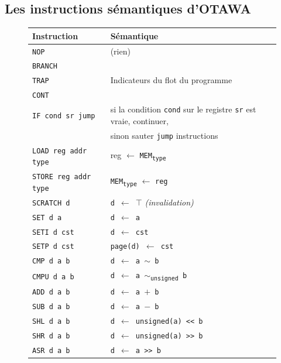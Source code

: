 \documentclass[french]{article}
\begin{document}
  \newpage{} %
  \subsection{Les instructions sémantiques d'OTAWA} 
 
  \begin{figure}
    \begin{tabular}{|l|l|} \hline
      \textbf{Instruction} & \textbf{Sémantique}\\ \hline \hline
      \texttt{NOP} & (rien)\\ \hline
      \texttt{BRANCH} & \\
      \texttt{TRAP} & Indicateurs du flot du programme\\
      \texttt{CONT} & \\ \hline
      \texttt{IF cond sr jump} & si la condition \texttt{cond} sur le registre \texttt{sr} est vraie, continuer,\\
      & sinon sauter \texttt{jump} instructions\\ \hline
      \texttt{LOAD reg addr type} & reg $\leftarrow$ \texttt{MEM\textsubscript{type}} \\ \hline
      \texttt{STORE reg addr type} & \texttt{MEM\textsubscript{type}} $\leftarrow$ \texttt{reg}\\ \hline
      \texttt{SCRATCH d} & \texttt{d $\leftarrow$ $\top$} \textit{(invalidation)}\\ \hline
      \texttt{SET d a} & \texttt{d $\leftarrow$ a}\\ \hline
      \texttt{SETI d cst} & \texttt{d $\leftarrow$ cst}\\ \hline
      \rowcolor{Gray} \texttt{SETP d cst} & \texttt{page(d) $\leftarrow$ cst}\\ \hline
      \texttt{CMP d a b} & \texttt{d $\leftarrow$ a $\sim$ b}\\ \hline
      \rowcolor{Gray} \texttt{CMPU d a b} & \texttt{d $\leftarrow$ a $\sim$\textsubscript{unsigned} b}\\ \hline
      \texttt{ADD d a b} & \texttt{d $\leftarrow$ a $+$ b}\\ \hline
      \texttt{SUB d a b} & \texttt{d $\leftarrow$ a $-$ b}\\ \hline
      \rowcolor{Gray} \texttt{SHL d a b} & \texttt{d $\leftarrow$ unsigned(a) <{<} b}\\ \hline
      \rowcolor{Gray} \texttt{SHR d a b} & \texttt{d $\leftarrow$ unsigned(a) >{>} b}\\ \hline
      \texttt{ASR d a b} & \texttt{d $\leftarrow$ a >{>} b}\\ \hline

\end{tabular}
\end{figure}
\end{document}
